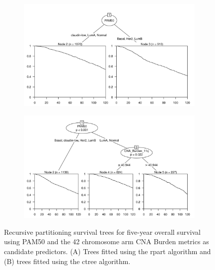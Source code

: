 \begin{figure}[!htb]
\centering

\vspace{0.5cm}

\begin{subfigure}{\textwidth}
\subcaption{}
\includegraphics[width=1\textwidth]{../figures/Appendices/Appendix_B/PA_PartyKit_Survival_Burden_TenYearOS_PAM50.png}
\end{subfigure}

\vspace{2cm}

\begin{subfigure}{\textwidth}
\subcaption{}
\includegraphics[width=1\textwidth]{../figures/Appendices/Appendix_B/PA_Ctree_Survival_Burden_TenYearOS_PAM50.png}
\end{subfigure}

\vspace{0.5cm}

\caption[Recursive partitioning survival trees for five-year overall survival using PAM50 and the 42 chromosome arm CNA Burden metrics as candidate predictors.]{Recursive partitioning survival trees for five-year overall survival using PAM50 and the 42 chromosome arm CNA Burden metrics as candidate predictors. (A) Trees fitted using the rpart algorithm and (B) trees fitted using the ctree algorithm.}
\end{figure}

